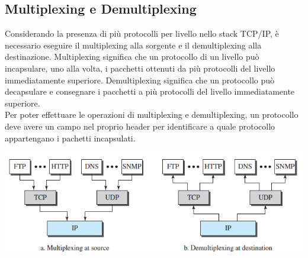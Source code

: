 \documentclass[12pt]{report}
\begin{document}
	\subsection{Multiplexing e Demultiplexing}
	Considerando la presenza di più protocolli per livello nello stack TCP/IP, è necessario eseguire il multiplexing alla sorgente e il demultiplexing alla destinazione. Multiplexing significa che un protocollo di un livello può incapsulare, uno alla volta, i pacchetti ottenuti da più protocolli del livello immediatamente superiore. Demultiplexing significa che un protocollo può decapsulare e consegnare i pacchetti a più protocolli del livello immediatamente superiore.
	\vspace{\baselineskip}\\
	Per poter effettuare le operazioni di multiplexing e demultiplexing, un protocollo deve avere un campo nel proprio header per identificare a quale protocollo appartengano i pachetti incapsulati.
	\begin{center}
		\includegraphics[scale=0.50]{assets/tcp-multiplexing.jpg}
	\end{center}
\end{document}
